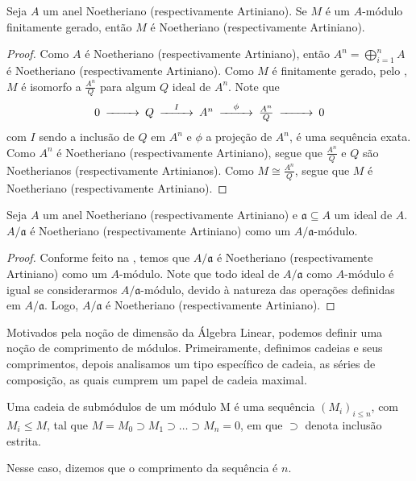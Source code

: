 \begin{proposition}
	\label{loc:6.5_:_anéis_noetherianos_e_artinianos_e_módulos}
	Seja $A$ um anel Noetheriano (respectivamente Artiniano). Se $M$ é um $A$-módulo finitamente gerado, então $M$ é Noetheriano (respectivamente Artiniano).
	\begin{proof}

		Como $A$ é Noetheriano (respectivamente Artiniano), então $A^{n}=\bigoplus_{i=1}^{n}A$ é Noetheriano (respectivamente Artiniano).
		Como $M$ é finitamente gerado, pelo , $M$ é isomorfo a $\frac{A^{n}}{Q}$ para algum $Q$ ideal de $A^{n}$.
		Note que
		\begin{equation*}
			\begin{CD}
				0 @>{}>>Q@>{I}>>A^{n}@>{\phi}>>\frac{A^{n}}{Q}@>{}>>0
			\end{CD}
		\end{equation*}
		com $I$ sendo a inclusão de $Q$ em $A^{n}$ e $\phi$ a projeção de $A^{n}$, é uma sequência exata.
		Como $A^{n}$ é Noetheriano (respectivamente Artiniano), segue que $\frac{A^{n}}{Q}$ e $Q$ são Noetherianos (respectivamente Artinianos). Como $M\cong\frac{A^{n}}{Q}$, segue que $M$ é Noetheriano (respectivamente Artiniano).
	\end{proof}
\end{proposition}
\begin{proposition}
	\label{loc:6.6_:_anéis_quocientes_de_noetherianos_ou_artinianos}
	Seja $A$ um anel Noetheriano (respectivamente Artiniano) e $\mathfrak{a}\subseteq A$ um ideal de $A$.
	$A/\mathfrak{a}$ é Noetheriano (respectivamente Artiniano) como um $A/\mathfrak{a}$-módulo.
	\begin{proof}
		Conforme feito na , temos que $A/\mathfrak{a}$ é Noetheriano (respectivamente Artiniano) como um $A$-módulo.
		Note que todo ideal de $A/\mathfrak{a}$ como $A$-módulo é igual se considerarmos $A/\mathfrak{a}$-módulo, devido à natureza das operações definidas em $A/\mathfrak{a}$. Logo, $A/\mathfrak{a}$ é Noetheriano (respectivamente Artiniano).
	\end{proof}
\end{proposition}
Motivados pela noção de dimensão da Álgebra Linear, podemos definir uma noção de comprimento de módulos. Primeiramente, definimos cadeias e seus comprimentos, depois analisamos um tipo específico de cadeia, as séries de composição, as quais cumprem um papel de cadeia maximal.
\begin{definition}
	\label{loc:def_3_:_cadeia_de_submódulos.definição_cadeia}
	Uma cadeia de submódulos de um módulo M é uma sequência $(M_{i})_{i\leq n}$, com $M_{i}\leq M$, tal que $M=M_{0}\supset M_{1}\supset\dots \supset M_{n}=0$, em que $\supset$ denota inclusão estrita.

	Nesse caso, dizemos que o comprimento da sequência é $n$.
\end{definition}
